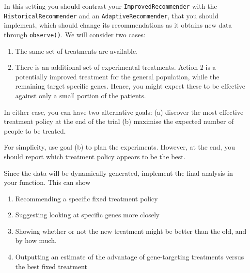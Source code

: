 \begin{exercise}
  In this setting you should contrast your \texttt{ImprovedRecommender} with the \texttt{HistoricalRecommender} and an \texttt{AdaptiveRecommender}, that you should implement, which should change its recommendations as it obtains new data through \verb!observe()!. We will consider two cases:
  \begin{enumerate}
  \item The same set of treatments are available.
  \item There is an additional set of experimental treatments.  Action
    2 is a potentially improved treatment for the general population,
    while the remaining target specific genes.  Hence, you might
    expect these to be effective against only a small portion of the
    patients.
  \end{enumerate}
  In either case, you can have two alternative goals: (a) discover the most effective treatment policy at the end of the trial (b) maximise the expected number of people to be treated.

  For simplicity, use goal (b) to plan the experiments. However, at the end, you should report which treatment policy appears to be the best.

  Since the data will be dynamically generated, implement the final analysis in your function. This can show
  \begin{enumerate}
  \item  Recommending a specific fixed treatment policy
  \item Suggesting looking at specific genes more closely
  \item Showing whether or not the new treatment might be better than the old, and by how much.
  \item  Outputting an estimate of the advantage of gene-targeting treatments versus the best fixed treatment
  \end{enumerate}
\end{exercise}






